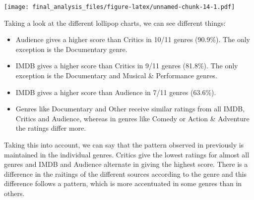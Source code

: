 \documentclass[]{article}
\providecommand{\tightlist}{%
  \setlength{\itemsep}{0pt}\setlength{\parskip}{0pt}}
\begin{document}
\texttt{[image: final\_analysis\_files/figure-latex/unnamed-chunk-14-1.pdf]}

Taking a look at the different lollipop charts, we can see different
things:

\begin{itemize}
\tightlist
\item
  Audience gives a higher score than Critics in 10/11 genres (90.9\%).
  The only exception is the Documentary genre.
\item
  IMDB gives a higher score than Critics in 9/11 genres (81.8\%). The
  only exception is the Documentary and Musical \& Performance genres.
\item
  IMDB gives a higher score than Audience in 7/11 genres (63.6\%).
\item
  Genres like Documentary and Other receive similar ratings from all
  IMDB, Critics and Audience, whereas in genres like Comedy or Action \&
  Adventure the ratings differ more.
\end{itemize}

Taking this into account, we can say that the pattern observed in
previously is maintained in the individual genres. Critics give the
lowest ratings for almost all genres and IMDB and Audience alternate in
giving the highest score. There is a difference in the raitings of the
different sources according to the genre and this difference follows a
pattern, which is more accentuated in some genres than in others.
\end{document}
